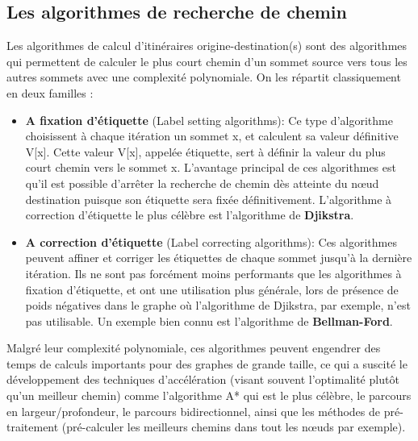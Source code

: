 \subsection{Les algorithmes de recherche de chemin}
Les algorithmes de calcul d'itinéraires origine-destination(s) sont des algorithmes qui permettent de calculer le plus court chemin d'un sommet source vers tous les autres sommets avec une complexité polynomiale.\newline
 On les répartit classiquement en deux familles : 
\begin{itemize}
	\item \textbf{A fixation d'étiquette} (Label setting algorithms): Ce type d'algorithme choisissent à chaque itération un sommet x, et calculent sa valeur définitive V[x]. Cette valeur V[x], appelée étiquette, sert à définir la valeur du plus court chemin vers le sommet x.
	L'avantage principal de ces algorithmes est qu'il est possible d'arrêter la recherche de chemin dès atteinte du nœud destination puisque son étiquette sera fixée définitivement.
	L'algorithme à correction d'étiquette le plus célèbre est l'algorithme de \textbf{Djikstra}.
	
	\item \textbf{A correction d'étiquette} (Label correcting algorithms): Ces algorithmes peuvent affiner et corriger les étiquettes de chaque sommet jusqu'à la dernière itération.
	Ils ne sont pas forcément moins performants que les algorithmes à fixation d'étiquette, et ont une utilisation plus générale, lors de présence de poids négatives dans le graphe où l'algorithme de Djikstra, par exemple, n'est pas utilisable.\newline
	Un exemple bien connu est l'algorithme de \textbf{Bellman-Ford}.
\end{itemize}

Malgré leur complexité polynomiale, ces algorithmes peuvent engendrer des temps de calculs importants pour des graphes de grande taille, ce qui a suscité le développement des techniques d'accélération (visant souvent l'optimalité plutôt qu'un meilleur chemin) comme l'algorithme A* qui est le plus célèbre, le parcours en largeur/profondeur, le parcours bidirectionnel, ainsi que les méthodes de pré-traitement (pré-calculer les meilleurs chemins dans tout les nœuds par exemple).

